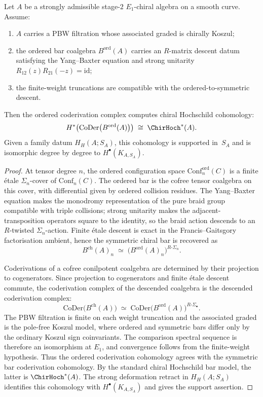 \begin{proposition}
\label{prop:ordered-bar-model-chiral-hochschild}
Let $A$ be a strongly admissible stage-$2$ $E_1$-chiral algebra on a
smooth curve. Assume:
\begin{enumerate}[label=\textup{(\roman*)}]
 \item $A$ carries a PBW filtration whose associated graded is chirally
 Koszul;
 \item the ordered bar coalgebra $B^{\mathrm{ord}}(A)$ carries an
 $R$-matrix descent datum satisfying the Yang--Baxter equation and
 strong unitarity $R_{12}(z)R_{21}(-z)=\mathrm{id}$;
 \item the finite-weight truncations are compatible with the
 ordered-to-symmetric descent.
\end{enumerate}
Then the ordered coderivation complex computes chiral Hochschild
cohomology:
\[
 H^*\!\left(\mathrm{CoDer}\bigl(B^{\mathrm{ord}}(A)\bigr)\right)
 \;\cong\;
 \ChirHoch^*(A).
\]
Given a family datum $H_H(A;S_A)$, this cohomology is supported
in~$S_A$ and is isomorphic degree by degree to $H^\bullet(K_{A,S_A})$.
\end{proposition}

\begin{proof}
At tensor degree $n$, the ordered configuration space
$\mathrm{Conf}^{\mathrm{ord}}_n(C)$ is a finite \'etale
$\Sigma_n$-cover of $\mathrm{Conf}_n(C)$. The ordered bar is the
cofree tensor coalgebra on this cover, with differential given by
ordered collision residues. The Yang--Baxter equation makes the
monodromy representation of the pure braid group compatible with
triple collisions; strong unitarity makes the adjacent-transposition
operators square to the identity, so the braid action descends to an
$R$-twisted $\Sigma_n$-action. Finite \'etale descent is exact in the
Francis--Gaitsgory factorisation ambient, hence the symmetric chiral
bar is recovered as
\[
 B^{\mathrm{ch}}(A)_n
 \;\simeq\;
 \bigl(B^{\mathrm{ord}}(A)_n\bigr)^{R\text{-}\Sigma_n}.
\]

Coderivations of a cofree conilpotent coalgebra are determined by their
projection to cogenerators. Since projection to cogenerators and
finite \'etale descent commute, the coderivation complex of the
descended coalgebra is the descended coderivation complex:
\[
\mathrm{CoDer}\bigl(B^{\mathrm{ch}}(A)\bigr)
\;\simeq\;
\mathrm{CoDer}\bigl(B^{\mathrm{ord}}(A)\bigr)^{R\text{-}\Sigma_\bullet}.
\]
The PBW filtration is finite on each weight truncation and the
associated graded is the pole-free Koszul model, where ordered and
symmetric bars differ only by the ordinary Koszul sign coinvariants.
The comparison spectral sequence is therefore an isomorphism at
$E_1$, and convergence follows from the finite-weight hypothesis.
Thus the ordered coderivation cohomology agrees with the symmetric
bar coderivation cohomology. By the standard chiral Hochschild bar
model, the latter is $\ChirHoch^*(A)$.  The strong deformation
retract in $H_H(A;S_A)$ identifies this cohomology with
$H^\bullet(K_{A,S_A})$ and gives the support assertion.
\end{proof}



